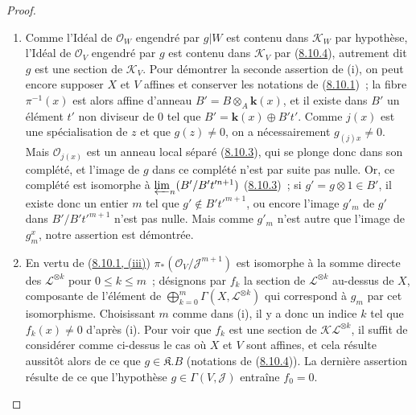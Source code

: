 \begin{proof}
\begin{enumerate}
  \item[\rm{(i)}] Comme l'Idéal de $\mathcal{O}_W$ engendré par $g|W$ est
  contenu dans $\mathcal{K}_W$ par hypothèse, l'Idéal de $\mathcal{O}_V$
  engendré par $g$ est contenu dans $\mathcal{K}_V$ par
  (\hyperref[II.8.10.4-fr]{8.10.4}), autrement dit $g$ est une section de
  $\mathcal{K}_V$. Pour démontrer la seconde assertion de (i), on peut encore
  supposer $X$ et $V$ affines et conserver les notations de
  (\hyperref[II.8.10.1-fr]{8.10.1})~; la fibre $\pi^{-1}(x)$ est alors affine
  d'anneau $B'=B\otimes_A \boldsymbol{k}(x)$, et il existe dans $B'$ un élément $t'$ non
  diviseur de 0 tel que $B'=\boldsymbol{k}(x)\oplus B't'$. Comme $j(x)$ est une
  spécialisation de $z$ et que $g(z)\neq0$, on a nécessairement
  $g_{(j)x}\neq0$. Mais $\mathcal{O}_{j(x)}$ est un anneau local séparé
  (\hyperref[II.8.10.3-fr]{8.10.3}), qui se plonge donc dans son complété, et
  l'image de $g$ dans ce complété n'est par suite pas nulle. Or, ce complété
  est isomorphe à $\varprojlim_n(B'/B't'^{n+1})$
  (\hyperref[II.8.10.3-fr]{8.10.3})~; si $g'=g\otimes1\in B'$, il existe donc
  un entier $m$ tel que $g'\notin B't'^{m+1}$, ou encore l'image $g'_m$ de
  $g'$ dans $B'/B't'^{m+1}$ n'est pas nulle. Mais comme $g'_m$ n'est autre que
  l'image de $g_m^x$, notre assertion est démontrée.
  \item[\rm{(ii)}] En vertu de
  (\hyperref[II.8.10.1-fr]{8.10.1, (iii)})
  $\pi_*(\mathcal{O}_V/\mathcal{J}^{m+1})$ est isomorphe à la somme directe
  des $\mathcal{L}^{\otimes k}$ pour $0\leqslant k\leqslant m$~; désignons
  par $f_k$ la section de $\mathcal{L}^{\otimes k}$ au-dessus de $X$,
  composante de l'élément de
  $\bigoplus_{k=0}^m\Gamma(X,\mathcal{L}^{\otimes k})$ qui correspond à $g_m$
  par cet isomorphisme. Choisissant $m$ comme dans (i), il y a donc un indice
  $k$ tel que $f_k(x)\neq0$ d'après (i). Pour voir que $f_k$ est une section
  de $\mathcal{K}\mathcal{L}^{\otimes k}$, il suffit de considérer comme
  ci-dessus le cas où $X$ et $V$ sont affines, et cela résulte aussitôt alors
  de ce que $g\in\mathfrak{K}.B$ (notations de
  (\hyperref[II.8.10.4-fr]{8.10.4})). La dernière assertion résulte de ce que
  l'hypothèse $g\in\Gamma(V,\mathcal{J})$ entraîne $f_0=0$.
\end{enumerate}
\end{proof}

